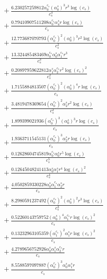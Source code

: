 \documentclass[10pt]{article}
\begin{document}
\begin{align*}
&{}  + \frac{6.230257259812 \alpha_{0}^{c_s} \left(\alpha_{0}^s\right)^{3} r^{3} \log{\left(c_{s} \right)}}{c_{s}^{3}} \\
&{}  + \frac{0.79410907511208 \alpha_{0}^{c_s} \alpha_{4}^s r \log{\left(c_{s} \right)}}{c_{s}} \\
&{}  + \frac{12.773687070793 \left(\alpha_{0}^{c_s}\right)^{2} \left(\alpha_{0}^s\right)^{3} r^{2} \log{\left(c_{s} \right)}}{c_{s}^{2}} \\
&{}  + \frac{13.324485483469 \alpha_{0}^{c_s} \alpha_{0}^s \alpha_{1}^{c_s} r^{3}}{c_{s}^{3}} \\
&{}  + \frac{0.20897959622812 \alpha_{1}^s \alpha_{2}^{c_s} r^{2} \log{\left(c_{s} \right)}^{2}}{c_{s}^{2}} \\
&{}  + \frac{1.7155884813507 \left(\alpha_{0}^{c_s}\right)^{2} \left(\alpha_{0}^s\right)^{4} r \log{\left(c_{s} \right)}}{c_{s}} \\
&{}  + \frac{3.4819478369654 \left(\alpha_{0}^{c_s}\right)^{2} \alpha_{2}^s r^{2} \log{\left(c_{s} \right)}}{c_{s}^{2}} \\
&{}  + \frac{1.899399021936 \left(\alpha_{0}^{c_s}\right)^{3} \left(\alpha_{0}^s\right)^{3} r \log{\left(c_{s} \right)}}{c_{s}} \\
&{}  + \frac{1.9363711545131 \left(\alpha_{0}^{c_s}\right)^{3} \alpha_{2}^s r \log{\left(c_{s} \right)}}{c_{s}} \\
&{}  + \frac{0.12628604745819 \alpha_{0}^{c_s} \alpha_{0}^s r^{5} \log{\left(c_{s} \right)}}{c_{s}^{5}} \\
&{}  + \frac{0.12645048241413 \alpha_{0}^s \alpha_{1}^s r^{4} \log{\left(c_{s} \right)}^{2}}{c_{s}^{4}} \\
&{}  + \frac{4.0502859330228 \alpha_{0}^s \alpha_{1}^{c_s} \alpha_{2}^s r}{c_{s}} \\
&{}  + \frac{8.2980591237492 \left(\alpha_{0}^{c_s}\right)^{2} \left(\alpha_{0}^s\right)^{2} r^{3} \log{\left(c_{s} \right)}}{c_{s}^{3}} \\
&{}  + \frac{0.52260143759752 \left(\alpha_{0}^s\right)^{4} \alpha_{1}^{c_s} r \log{\left(c_{s} \right)}^{2}}{c_{s}} \\
&{}  + \frac{0.13232963105359 \left(\alpha_{1}^{c_s}\right)^{2} \alpha_{1}^s r \log{\left(c_{s} \right)}^{2}}{c_{s}} \\
&{}  + \frac{4.2789656752926 \alpha_{0}^s \alpha_{1}^s \alpha_{2}^{c_s} r}{c_{s}} \\
&{}  + \frac{8.5588597097887 \left(\alpha_{0}^{c_s}\right)^{3} \alpha_{0}^s \alpha_{1}^s r}{c_{s}} \\

\end{align*}
\end{document}
